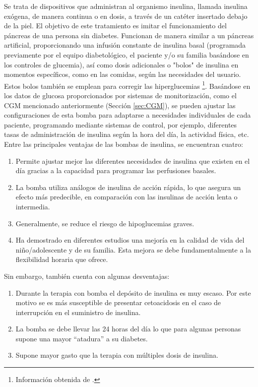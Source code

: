 Se trata de dispositivos que administran al organismo insulina, llamada insulina exógena, de manera continua o en dosis, a través de un catéter insertado debajo de la piel. El objetivo de este tratamiento es imitar el funcionamiento del páncreas de una persona sin diabetes. Funcionan de manera similar a un páncreas artificial, proporcionando una infusión constante de insulina basal (programada previamente por el equipo diabetológico, el paciente y/o su familia basándose en los controles de glucemia), así como dosis adicionales o "bolos" de insulina en momentos específicos, como en las comidas, según las necesidades del usuario. Estos bolos también se emplean para corregir las hiperglucemias \footnote{Información obtenida de \cite{FundacionParaLaSalud}.}.
Basándose en los datos de glucosa proporcionados por sistemas de monitorización, como el CGM mencionado anteriormente (Sección \ref{sec:CGM}), se pueden ajustar las configuraciones de esta bomba para adaptarse a necesidades individuales de cada paciente, programando mediante sistemas de control, por ejemplo, diferentes tasas de administración de insulina según la hora del día, la actividad física, etc. 
Entre las principales ventajas de las bombas de insulina, se encuentran cuatro:
\begin{enumerate}
    \item Permite ajustar mejor las diferentes necesidades de insulina que existen en el día gracias a la capacidad para programar las perfusiones basales.
    \item La bomba utiliza análogos de insulina de acción rápida, lo que asegura un efecto más predecible, en comparación con las insulinas de acción lenta o intermedia.
    \item Generalmente, se reduce el riesgo de hipoglucemias graves.
    \item Ha demostrado en diferentes estudios una mejoría en la calidad de vida del niño/adolescente y de su familia. Esta mejora se debe fundamentalmente a la flexibilidad horaria que ofrece.
\end{enumerate}

Sin embargo, también cuenta con algunas desventajas:
\begin{enumerate}
    \item Durante la terapia con bomba el depósito de insulina es muy escaso. Por este motivo se es más susceptible de presentar cetoacidosis en el caso de interrupción en el suministro de insulina.
    \item La bomba se debe llevar las 24 horas del día lo que para algunas personas supone una mayor “atadura” a su diabetes.
    \item Supone mayor gasto que la terapia con múltiples dosis de insulina.
\end{enumerate}


